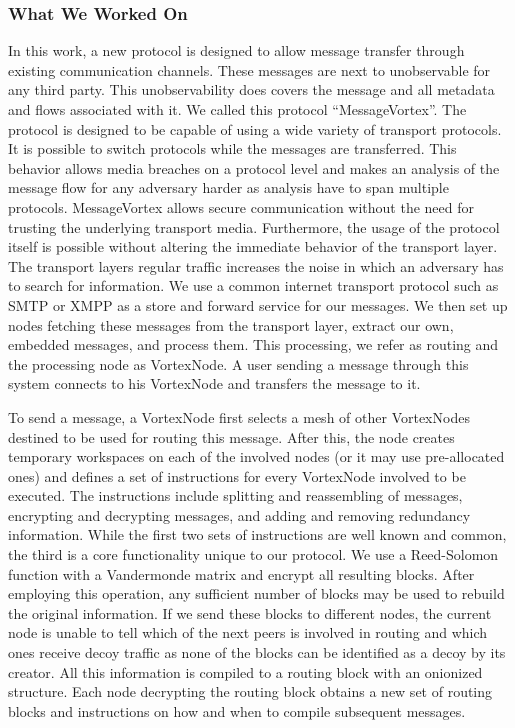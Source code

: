 \documentclass[10pt,journal,compsoc,twocolumn,twoside]{IEEEtran}
\begin{document}
\subsubsection{What We Worked On}
In this work, a new protocol is designed to allow message transfer through existing communication channels. These messages are next to unobservable for any third party. This unobservability does covers the message and all metadata and flows associated with it. We called this protocol ``MessageVortex''. The protocol is designed to be capable of using a wide variety of transport protocols. It is possible to switch protocols while the messages are transferred. This behavior allows media breaches on a protocol level and makes an analysis of the message flow for any adversary harder as analysis have to span multiple protocols. MessageVortex allows secure communication without the need for trusting the underlying transport media. Furthermore, the usage of the protocol itself is possible without altering the immediate behavior of the transport layer. The transport layers regular traffic increases the noise in which an adversary has to search for information. We use a common internet transport protocol such as SMTP or XMPP as a store and forward service for our messages. We then set up nodes fetching these messages from the transport layer, extract our own, embedded messages, and process them. This processing, we refer as routing and the processing node as VortexNode. A user sending a message through this system connects to his VortexNode and transfers the message to it. 

To send a message, a VortexNode first selects a mesh of other VortexNodes destined to be used for routing this message. After this, the node creates temporary workspaces on each of the involved nodes (or it may use pre-allocated ones) and defines a set of instructions for every VortexNode involved to be executed. The instructions include splitting and reassembling of messages, encrypting and decrypting messages, and adding and removing redundancy information. While the first two sets of instructions are well known and common, the third is a core functionality unique to our protocol. We use a Reed-Solomon function with a Vandermonde matrix and encrypt all resulting blocks. After employing this operation, any sufficient number of blocks may be used to rebuild the original information. If we send these blocks to different nodes, the current node is unable to tell which of the next peers is involved in routing and which ones receive decoy traffic as none of the blocks can be identified as a decoy by its creator. All this information is compiled to a routing block with an onionized structure. Each node decrypting the routing block obtains a new set of routing blocks and instructions on how and when to compile subsequent messages. 
\end{document}
